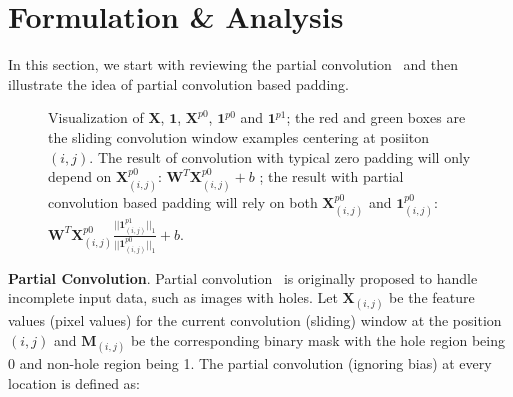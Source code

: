 \documentclass[10pt,twocolumn,letterpaper]{article}
\begin{document}



\section{Formulation \& Analysis}

In this section, we start with reviewing the partial convolution~\cite{liu2018image} and then illustrate the idea of partial convolution based padding. 

\begin{figure*}[h]
\centering
    \caption{Visualization of $\mathbf{X}$, $\mathbf{1}$, $\mathbf{X}^{p0}$, $\mathbf{1}^{p0}$ and $\mathbf{1}^{p1}$; the red and green boxes are the sliding convolution window examples centering at posiiton $(i, j)$. The result of convolution with typical zero padding will only depend on $\mathbf{X}^{p0}_{(i,j)}$: $\mathbf{W}^T\mathbf{X}^{p0}_{(i,j)}+b$ ; the result with partial convolution based padding will rely on both $\mathbf{X}^{p0}_{(i,j)}$ and $\mathbf{1}^{p0}_{(i,j)}$: $\mathbf{W}^T\mathbf{X}^{p0}_{(i,j)}\frac{||\mathbf{1}^{p1}_{(i,j)}||_1}{||\mathbf{1}^{p0}_{(i,j)}||_1} + b$.}
    \label{fig:notation}
    \vspace{-.2cm}
\end{figure*}\textbf{Partial Convolution}. Partial convolution~\cite{liu2018image} is originally proposed to handle incomplete input data, such as images with holes. Let $\mathbf{X}_{(i,j)}$ be the feature values (pixel values) for the current convolution (sliding) window at the position $(i,j)$ and $\mathbf{M}_{(i,j)}$ be the corresponding binary mask with the hole region being 0 and non-hole region being 1. The partial convolution (ignoring bias) 
at every location is defined as:
\end{document}
